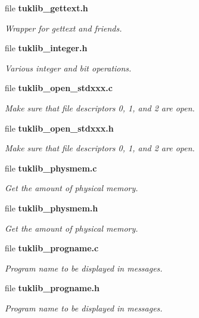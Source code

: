 \begin{DoxyCompactItemize}
file \textbf{ tuklib\+\_\+gettext.\+h}
\begin{DoxyCompactList}\small\item\em Wrapper for gettext and friends. \end{DoxyCompactList}\item 
file \textbf{ tuklib\+\_\+integer.\+h}
\begin{DoxyCompactList}\small\item\em Various integer and bit operations. \end{DoxyCompactList}\item 
file \textbf{ tuklib\+\_\+open\+\_\+stdxxx.\+c}
\begin{DoxyCompactList}\small\item\em Make sure that file descriptors 0, 1, and 2 are open. \end{DoxyCompactList}\item 
file \textbf{ tuklib\+\_\+open\+\_\+stdxxx.\+h}
\begin{DoxyCompactList}\small\item\em Make sure that file descriptors 0, 1, and 2 are open. \end{DoxyCompactList}\item 
file \textbf{ tuklib\+\_\+physmem.\+c}
\begin{DoxyCompactList}\small\item\em Get the amount of physical memory. \end{DoxyCompactList}\item 
file \textbf{ tuklib\+\_\+physmem.\+h}
\begin{DoxyCompactList}\small\item\em Get the amount of physical memory. \end{DoxyCompactList}\item 
file \textbf{ tuklib\+\_\+progname.\+c}
\begin{DoxyCompactList}\small\item\em Program name to be displayed in messages. \end{DoxyCompactList}\item 
file \textbf{ tuklib\+\_\+progname.\+h}
\begin{DoxyCompactList}\small\item\em Program name to be displayed in messages. \end{DoxyCompactList}\end{DoxyCompactItemize}
